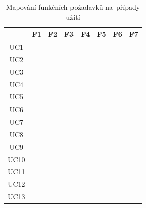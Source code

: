 \begin{table}[h]
	\centering
	\caption{\label{table:use-cases}Mapování funkčních požadavků na~případy užití}
	\begin{tabularx}{0.95\textwidth}{|C||C|C|C|C|C|C|C|}
		\hline
			 & F1 & F2 & F3 & F4 & F5 & F6 & F7 				\\ \hline\hline
		UC1  & \Checkmark &    &    &    &    &    &    		\\ \hline
		UC2  & \Checkmark &    &    &    &    &    &    		\\ \hline
		UC3  &    & \Checkmark &    &    &    &    &    		\\ \hline
		UC4  &    & \Checkmark &    &    &    &    &    		\\ \hline
		UC5  &    &    & \Checkmark &    &    &    &    		\\ \hline
		UC6  &    &    & \Checkmark &    &    &    &    		\\ \hline
		UC7  &    &    &    &    &    &    & \Checkmark 		\\ \hline
		UC8  & \Checkmark &    &    &    & \Checkmark &    &	\\ \hline
		UC9  &    & \Checkmark &    &    & \Checkmark &    &	\\ \hline
		UC10 &    & \Checkmark &    &    &    &    &    		\\ \hline
		UC11 &    &    &    & \Checkmark &    &    &    		\\ \hline
		UC12 &    &    &    &    &    & \Checkmark &    		\\ \hline
		UC13 & \Checkmark &    &    &    &    &    &    		\\ \hline
	\end{tabularx}
\end{table}
